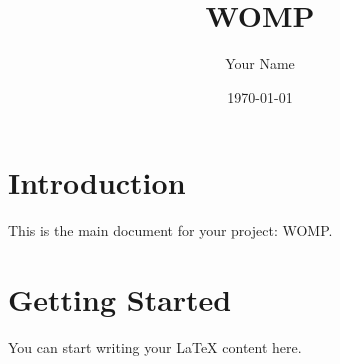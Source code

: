 \documentclass{article}
\title{WOMP}
\author{Your Name}
\date{\today}
\begin{document}
\maketitle

\section{Introduction}
This is the main document for your project: WOMP.

\section{Getting Started}
You can start writing your LaTeX content here.
\end{document}
